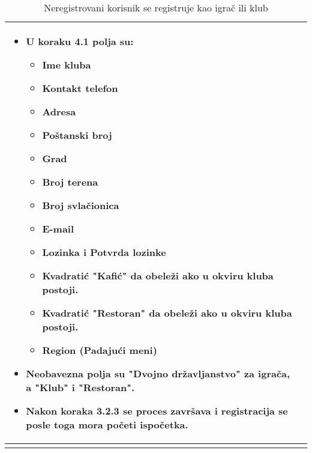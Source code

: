 \documentclass{article}
\begin{document}
\begin{longtable}{| p{} | p{} |}
\begin{itemize}
\begin{itemize}
                    \end{itemize}
            \end{itemize}
            \begin{itemize} 
                \item U koraku 4.1 polja su: 
                    \begin{itemize}
                        \item Ime kluba
                        \item Kontakt telefon
                        \item Adresa
                        \item Poštanski broj
                        \item Grad 
                        \item Broj terena
                        \item Broj svlačionica
                        \item E-mail
                        \item Lozinka i Potvrda lozinke
                        \item Kvadratić "Kafić" da obeleži ako u okviru kluba postoji.
                        \item Kvadratić "Restoran" da obeleži ako u okviru kluba postoji.
                        \item Region (Padajući meni)
                    \end{itemize}
                \item Neobavezna polja su "Dvojno državljanstvo" za igrača, a "Klub" i "Restoran". 
                \item Nakon koraka 3.2.3 se proces završava i registracija se posle toga mora početi ispočetka. 
            \end{itemize}\\
        \hline
        \caption{Neregistrovani korisnik se registruje kao igrač ili klub} 
        \end{longtable}
\end{document}
